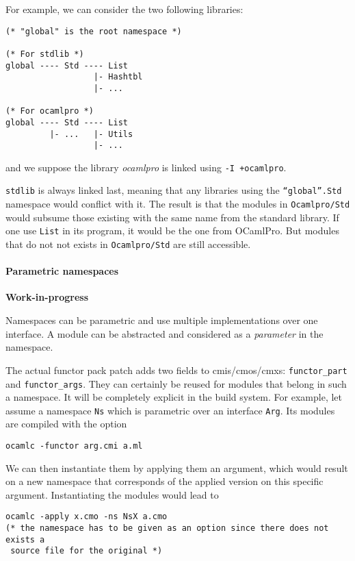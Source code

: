 \documentclass[11pt,a4paper]{article}
\begin{document}
For example, we can consider the two following libraries:

\begin{verbatim}
(* "global" is the root namespace *)

(* For stdlib *)
global ---- Std ---- List
                  |- Hashtbl
                  |- ...

(* For ocamlpro *)
global ---- Std ---- List
         |- ...   |- Utils
                  |- ...
\end{verbatim}
and we suppose the library \emph{ocamlpro} is linked using \texttt{-I +ocamlpro}.

\texttt{stdlib} is always linked last, meaning that any libraries using the
\texttt{``global''.Std} namespace would conflict with it. The result is that the
modules in \texttt{Ocamlpro/Std} would subsume those existing with the same name
from the standard library. If one use \texttt{List} in its program, it would be
the one from OCamlPro. But modules that do not not exists in
\texttt{Ocamlpro/Std} are still accessible.


\paragraph{Parametric namespaces}

\textbf{Work-in-progress}

Namespaces can be parametric and use multiple implementations over one
interface. A module can be abstracted and considered as a \emph{parameter} in
the namespace. 

The actual functor pack patch adds two fields to cmis/cmos/cmxs:
\lstinline{functor_part} and \lstinline{functor_args}. They can certainly be
reused for modules that belong in such a namespace. It will be completely
explicit in the build system. For example, let assume a namespace \texttt{Ns}
which is parametric over an interface \texttt{Arg}. Its modules are compiled
with the option 

\begin{verbatim}
ocamlc -functor arg.cmi a.ml
\end{verbatim}

We can then instantiate them by applying them an argument, which would result on
a new namespace that corresponds of the applied version on this specific
argument. Instantiating the modules would lead to 

\begin{verbatim}
ocamlc -apply x.cmo -ns NsX a.cmo 
(* the namespace has to be given as an option since there does not exists a
 source file for the original *)
\end{verbatim}
\end{document}
